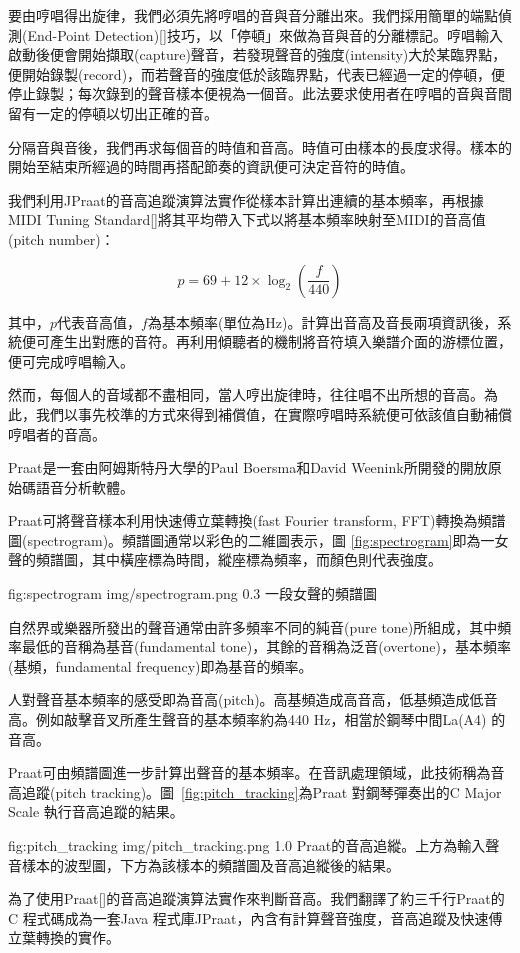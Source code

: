 \documentclass[12pt,a4paper,oneside]{report}
\begin{document}
要由哼唱得出旋律，我們必須先將哼唱的音與音分離出來。我們採用簡單的端點偵測(End-Point Detection)[]技巧，以「停頓」來做為音與音的分離標記。哼唱輸入啟動後便會開始擷取(capture)聲音，若發現聲音的強度(intensity)大於某臨界點，便開始錄製(record)，而若聲音的強度低於該臨界點，代表已經過一定的停頓，便停止錄製；每次錄到的聲音樣本便視為一個音。此法要求使用者在哼唱的音與音間留有一定的停頓以切出正確的音。

分隔音與音後，我們再求每個音的時值和音高。時值可由樣本的長度求得。樣本的開始至結束所經過的時間再搭配節奏的資訊便可決定音符的時值。

我們利用JPraat的音高追蹤演算法實作從樣本計算出連續的基本頻率，再根據MIDI Tuning Standard[]將其平均帶入下式以將基本頻率映射至MIDI的音高值(pitch number)：

\[
p=69+12\times\log_2{\left(\frac{f}{440}\right)}
\]

其中，\(p\)代表音高值，\(f\)為基本頻率(單位為Hz)。計算出音高及音長兩項資訊後，系統便可產生出對應的音符。再利用傾聽者的機制將音符填入樂譜介面的游標位置，便可完成哼唱輸入。

然而，每個人的音域都不盡相同，當人哼出旋律時，往往唱不出所想的音高。為此，我們以事先校準的方式來得到補償值，在實際哼唱時系統便可依該值自動補償哼唱者的音高。


Praat是一套由阿姆斯特丹大學的Paul Boersma和David Weenink所開發的開放原始碼語音分析軟體。

Praat可將聲音樣本利用快速傅立葉轉換(fast Fourier transform, FFT)轉換為頻譜圖(spectrogram)。頻譜圖通常以彩色的二維圖表示，圖 \ref{fig:spectrogram}即為一女聲的頻譜圖，其中橫座標為時間，縱座標為頻率，而顏色則代表強度。

\figurewithcaption
{fig:spectrogram}
{img/spectrogram.png}
{0.3}
{一段女聲的頻譜圖}

自然界或樂器所發出的聲音通常由許多頻率不同的純音(pure tone)所組成，其中頻率最低的音稱為基音(fundamental tone)，其餘的音稱為泛音(overtone)，基本頻率(基頻，fundamental frequency)即為基音的頻率。

人對聲音基本頻率的感受即為音高(pitch)。高基頻造成高音高，低基頻造成低音高。例如敲擊音叉所產生聲音的基本頻率約為440 Hz，相當於鋼琴中間La(A4) 的音高。

Praat可由頻譜圖進一步計算出聲音的基本頻率。在音訊處理領域，此技術稱為音高追蹤(pitch tracking)。圖~\ref{fig:pitch_tracking}為Praat 對鋼琴彈奏出的C Major Scale 執行音高追蹤的結果。


\figurewithcaption
{fig:pitch_tracking}
{img/pitch_tracking.png}
{1.0}
{Praat的音高追縱。上方為輸入聲音樣本的波型圖，下方為該樣本的頻譜圖及音高追縱後的結果。}

為了使用Praat[]的音高追蹤演算法實作來判斷音高。我們翻譯了約三千行Praat的C 程式碼成為一套Java 程式庫JPraat，內含有計算聲音強度，音高追蹤及快速傅立葉轉換的實作。


\end{document}
